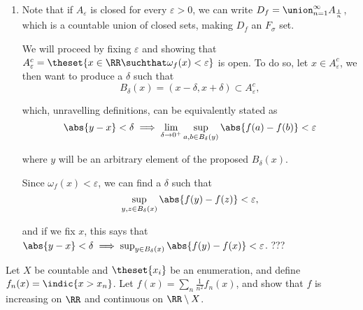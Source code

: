 \begin{solution}
\begin{enumerate}
  \item Note that if $A_\varepsilon$ is closed for every $\varepsilon > 0$, we can write $D_f = \union_{n=1}^\infty A_{\frac 1 n}$, which is a countable union of closed sets, making $D_f$ an $F_\sigma$ set.

  We will proceed by fixing $\varepsilon$ and showing that $A_\varepsilon^c = \theset{x\in \RR \suchthat \omega_f(x) < \varepsilon}$ is open. To do so, let $x\in A_\varepsilon^c$, we then want to produce a $\delta$ such that
  $$
  B_\delta(x) = (x-\delta, x+\delta) \subset A_\varepsilon^c,
  $$

  which, unravelling definitions, can be equivalently stated as
  $$
  \abs{y - x} < \delta \implies
  \lim_{\delta\to 0^+} \sup_{a,b \in B_\delta(y)}\abs{f(a) - f(b)} < \varepsilon
  $$

  where $y$ will be an arbitrary element of the proposed $B_\delta(x)$.

  Since $\omega_f(x) < \varepsilon$, we can find a $\delta$ such that
  $$
  \sup_{y,z \in B_{\delta}(x)} \abs{f(y) - f(z)} < \varepsilon,
  $$

  and if we fix $x$, this says that $\abs{y - x} < \delta \implies \sup_{y \in B_\delta(x)} \abs{f(y) - f(x)} < \varepsilon$. ???
\end{enumerate}
\end{solution}

\begin{problem}
  Let $X$ be countable and $\theset{x_i}$ be an enumeration, and define $f_n(x) = \indic{x > x_n}$. Let $f(x) = \sum_n \frac 1 {n^2} f_n(x)$, and show that $f$ is increasing on $\RR$ and continuous on $\RR\setminus X$.
\end{problem}

